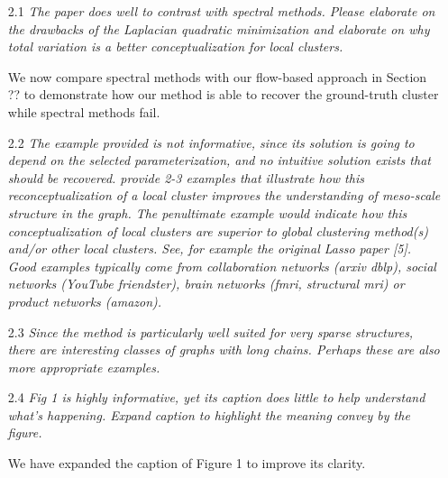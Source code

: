 \documentclass[11pt,onecolumn]{IEEEtran}
\begin{document}
\begin{enumerate}

\item[2.1] {\em The paper does well to contrast with spectral methods. Please elaborate on 
	the drawbacks of the Laplacian quadratic minimization and elaborate on why total variation 
	is a better conceptualization for local clusters.}

\vspace*{2mm}
We now compare spectral methods with our flow-based approach in Section ?? to demonstrate 
how our method is able to recover the ground-truth cluster while spectral methods fail. 
\vspace*{3mm} 

\item[2.2] {\em The example provided is not informative, since its solution is going to depend on the selected
parameterization, and no intuitive solution exists that should be recovered. provide 2-3
examples that illustrate how this reconceptualization of a local cluster improves the
understanding of meso-scale structure in the graph. The penultimate example would indicate
how this conceptualization of local clusters are superior to global clustering method(s) and/or
other local clusters. See, for example the original Lasso paper [5]. Good examples typically
come from collaboration networks (arxiv dblp), social networks (YouTube friendster), brain
networks (fmri, structural mri) or product networks (amazon).
}

\vspace*{2mm}

\vspace*{3mm} 

\item[2.3] {\em Since the method is particularly well suited for very sparse structures, there are interesting
classes of graphs with long chains. Perhaps these are also more appropriate examples.
}

\vspace*{2mm}

\vspace*{3mm} 

\item[2.4] {\em Fig 1 is highly informative, yet its caption does little to help understand what’s happening.
Expand caption to highlight the meaning convey by the figure.
}

\vspace*{2mm}
We have expanded the caption of Figure 1 to improve its clarity. 
\vspace*{3mm} 



\end{enumerate} 
\end{document}

